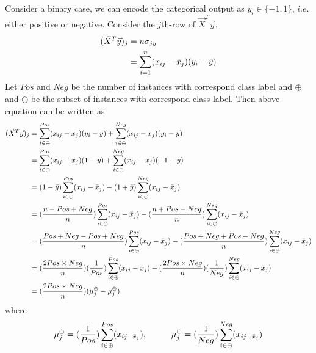 \documentclass{article}
\begin{document}
\paragraph{}
Consider a binary case, we can encode the categorical output as $y_i \in\{-1, 1\}$, $i.e.$ either positive or negative. 
Consider the $j$th-row of $\Vec{X}^T\Vec{y}$,
\begin{align*}
    (\Vec{X}^T\Vec{y})_j &= n \sigma_{jy} \\
    &= \displaystyle\sum_{i=1}^{n} (x_{ij}-\Bar{x}_{j})(y_i - \Bar{y}) 
\end{align*} 
Let $Pos$ and $Neg$ be the number of instances with correspond class label and $\oplus$ and $\ominus$ be the subset of instances with correspond class label. Then above equation can be written as
\begin{align*}
    (\Vec{X}^T\Vec{y})_j &=
    \displaystyle\sum_{i\in\oplus}^{Pos} (x_{ij}-\Bar{x}_{j})(y_i - \Bar{y})
    +
    \displaystyle\sum_{i\in\ominus}^{Neg} (x_{ij}-\Bar{x}_{j})(y_i - \Bar{y}) \\
    &=
    \displaystyle\sum_{i\in\oplus}^{Pos} (x_{ij}-\Bar{x}_{j})(1 - \Bar{y})
    +
    \displaystyle\sum_{i\in\ominus}^{Neg} (x_{ij}-\Bar{x}_{j})(-1 - \Bar{y}) \\
    &=
    (1-\Bar{y})\displaystyle\sum_{i\in\oplus}^{Pos} (x_{ij}-\Bar{x}_{j})
    -
    (1+\Bar{y})\displaystyle\sum_{i\in\ominus}^{Neg} (x_{ij}-\Bar{x}_{j}) \\
    &=
    (\frac{n-Pos+Neg}{n})\displaystyle\sum_{i\in\oplus}^{Pos}(x_{ij}-\Bar{x}_{j})
    -
    (\frac{n+Pos-Neg}{n})\displaystyle\sum_{i\in\ominus}^{Neg}(x_{ij}-\Bar{x}_{j})
    \\
    &=
    (\frac{Pos+Neg-Pos+Neg}{n})\displaystyle\sum_{i\in\oplus}^{Pos}(x_{ij}-\Bar{x}_{j})
    -
    (\frac{Pos+Neg+Pos-Neg}{n})\displaystyle\sum_{i\in\ominus}^{Neg}(x_{ij}-\Bar{x}_{j}) \\
    &=
    (\frac{2Pos\times Neg}{n})(\frac{1}{Pos}) \displaystyle\sum_{i\in\oplus}^{Pos}(x_{ij}-\Bar{x}_{j}) -
    (\frac{2Pos\times Neg}{n})(\frac{1}{Neg}) \displaystyle\sum_{i\in\ominus}^{Neg}(x_{ij}-\Bar{x}_{j}) \\
    &=
    (\frac{2Pos\times Neg}{n})(\mu_j^{\oplus}-\mu_j^{\ominus})
\end{align*}
where
\begin{equation*}
    \mu_j^{\oplus} = (\frac{1}{Pos}) \displaystyle\sum_{i\in\oplus}^{Pos}(x_{ij-\Bar{x}_{j}}),  \hspace{10mm} 
    \mu_j^{\ominus} = (\frac{1}{Neg}) \displaystyle\sum_{i\in\ominus}^{Neg}(x_{ij-\Bar{x}_{j}})
\end{equation*}
\end{document}
